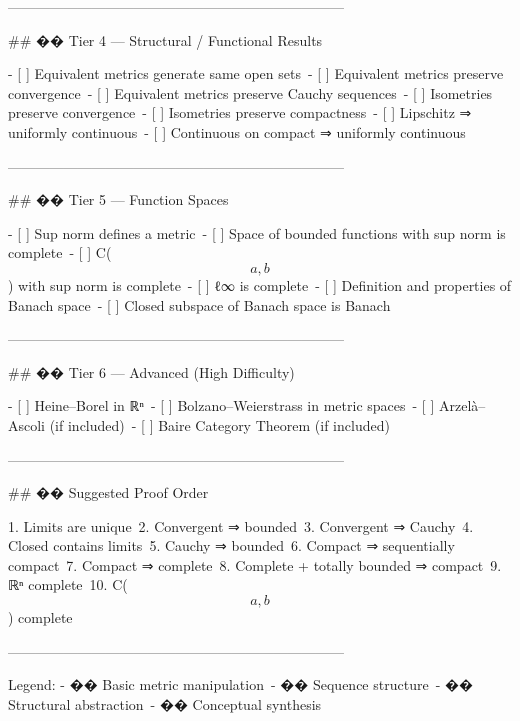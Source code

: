 ------------------------------------------------------------------------

## �� Tier 4 --- Structural / Functional Results

-   [ ] Equivalent metrics generate same open sets\
-   [ ] Equivalent metrics preserve convergence\
-   [ ] Equivalent metrics preserve Cauchy sequences\
-   [ ] Isometries preserve convergence\
-   [ ] Isometries preserve compactness\
-   [ ] Lipschitz ⇒ uniformly continuous\
-   [ ] Continuous on compact ⇒ uniformly continuous

------------------------------------------------------------------------

## �� Tier 5 --- Function Spaces

-   [ ] Sup norm defines a metric\
-   [ ] Space of bounded functions with sup norm is complete\
-   [ ] C(\[a,b\]) with sup norm is complete\
-   [ ] ℓ∞ is complete\
-   [ ] Definition and properties of Banach space\
-   [ ] Closed subspace of Banach space is Banach

------------------------------------------------------------------------

## �� Tier 6 --- Advanced (High Difficulty)

-   [ ] Heine--Borel in ℝⁿ\
-   [ ] Bolzano--Weierstrass in metric spaces\
-   [ ] Arzelà--Ascoli (if included)\
-   [ ] Baire Category Theorem (if included)

------------------------------------------------------------------------

## �� Suggested Proof Order

1.  Limits are unique\
2.  Convergent ⇒ bounded\
3.  Convergent ⇒ Cauchy\
4.  Closed contains limits\
5.  Cauchy ⇒ bounded\
6.  Compact ⇒ sequentially compact\
7.  Compact ⇒ complete\
8.  Complete + totally bounded ⇒ compact\
9.  ℝⁿ complete\
10. C(\[a,b\]) complete

------------------------------------------------------------------------

Legend: - �� Basic metric manipulation\
- �� Sequence structure\
- �� Structural abstraction\
- �� Conceptual synthesis
